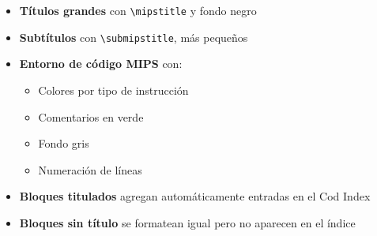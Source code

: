 \documentclass{article}
\begin{document}
\begin{itemize}
    \item \textbf{Títulos grandes} con \verb|\mipstitle| y fondo negro
    \item \textbf{Subtítulos} con \verb|\submipstitle|, más pequeños
    \item \textbf{Entorno de código MIPS} con:
    \begin{itemize}
        \item Colores por tipo de instrucción
        \item Comentarios en verde
        \item Fondo gris
        \item Numeración de líneas
    \end{itemize}
    \item \textbf{Bloques titulados} agregan automáticamente entradas en el Cod Index
    \item \textbf{Bloques sin título} se formatean igual pero no aparecen en el índice
\end{itemize}
\end{document}
